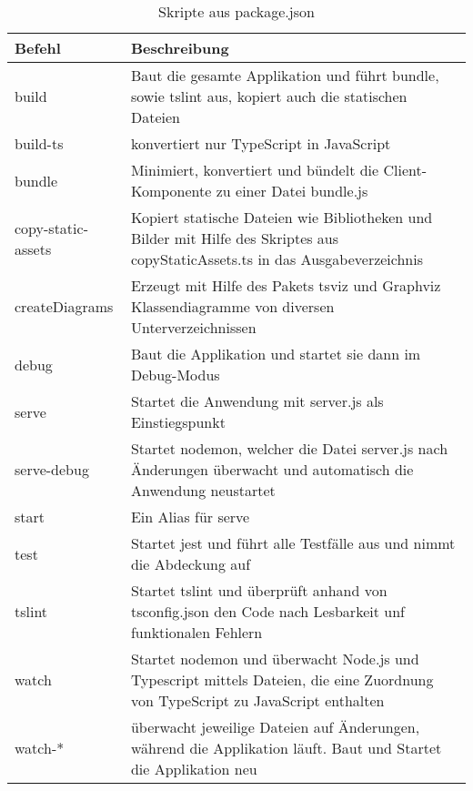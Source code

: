 \begin{table}
	\centering
	\begin{tabular}{|l| p{10cm}|}
		\hline
		\textbf{Befehl} & \textbf{Beschreibung} \\
		\hline \hline
		build 				& 	Baut die gesamte Applikation und führt bundle, sowie tslint aus, kopiert auch die statischen Dateien \\
		build-ts 			& 	konvertiert nur TypeScript in JavaScript \\
		bundle 				&	Minimiert, konvertiert und bündelt die Client-Komponente zu einer Datei bundle.js \\
		copy-static-assets 	& 	Kopiert statische Dateien wie Bibliotheken und Bilder mit Hilfe des Skriptes aus copyStaticAssets.ts in das Ausgabeverzeichnis \\
		createDiagrams 		& 	Erzeugt mit Hilfe des Pakets tsviz\footnotemark{} und Graphviz\footnotemark{} Klassendiagramme von diversen Unterverzeichnissen \\
		debug				&	Baut die Applikation und startet sie dann im Debug-Modus \\
		serve				&	Startet die Anwendung mit server.js als Einstiegspunkt \\
		serve-debug			&	Startet nodemon\footnotemark{}, welcher die Datei server.js nach Änderungen überwacht und automatisch die Anwendung neustartet \\
		start				&	Ein Alias für serve \\
		test				&	Startet jest und führt alle Testfälle aus und nimmt die Abdeckung auf \\
		tslint				&	Startet tslint und überprüft anhand von tsconfig.json den Code nach Lesbarkeit unf funktionalen Fehlern \\
		watch				&	Startet nodemon und überwacht Node.js und Typescript mittels Dateien, die eine Zuordnung von TypeScript zu JavaScript enthalten \\
		watch-*				&	überwacht jeweilige Dateien auf Änderungen, während die Applikation läuft. Baut und Startet die Applikation \ggf neu \\\hline
	\end{tabular}
	\captionsetup{justification=centering}
	\caption[Skripte]{Skripte aus package.json}
	\label{tab:Scripts}
\end{table}
\addtocounter{footnote}{-3} %

